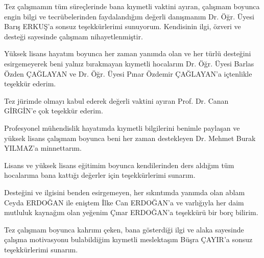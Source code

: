Tez çalışmamın tüm süreçlerinde bana kıymetli vaktini ayıran, çalışmam
boyunca engin bilgi ve tecrübelerinden faydalandığım değerli danışmanım
Dr. Öğr. Üyesi Barış ERKUŞ'a sonsuz teşekkürlerimi sunuyorum. Kendisinin
ilgi, özveri ve desteği sayesinde çalışmam nihayetlenmiştir.

Yüksek lisans hayatım boyunca her zaman yanımda olan ve her türlü
desteğini esirgemeyerek beni yalnız bırakmayan kıymetli hocalarım
Dr. Öğr. Üyesi Barlas Özden ÇAĞLAYAN ve Dr. Öğr. Üyesi Pınar Özdemir
ÇAĞLAYAN'a içtenlikle teşekkür ederim.

Tez jürimde olmayı kabul ederek değerli vaktini ayıran Prof. Dr. Canan
GİRGİN'e çok teşekkür ederim.

Profesyonel mühendislik hayatımda kıymetli bilgilerini benimle paylaşan
ve yüksek lisans çalışmam boyunca beni her zaman destekleyen Dr. Mehmet
Burak YILMAZ'a minnettarım.

Lisans ve yüksek lisans eğitimim boyunca kendilerinden ders aldığım
tüm hocalarıma bana kattığı değerler için teşekkürlerimi sunarım.

Desteğini ve ilgisini benden esirgemeyen, her sıkıntımda yanımda olan
ablam Ceyda ERDOĞAN ile eniştem İlke Can ERDOĞAN'a ve varlığıyla her
daim mutluluk kaynağım olan yeğenim Çınar ERDOĞAN'a teşekkürü bir
borç bilirim.

Tez çalışmam boyunca kahrımı çeken, bana gösterdiği ilgi ve alaka
sayesinde çalışma motivasyonu bulabildiğim kıymetli meslektaşım Büşra
ÇAYIR'a sonsuz teşekkürlerimi sunarım.
